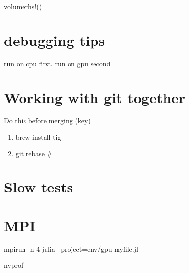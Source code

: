 \documentclass{article}
\begin{document}
volumerhs!()

\section{debugging tips}
run on cpu first. run on gpu second

\section{Working with git together}
Do this before merging (key)
\begin{enumerate}
    \item brew install tig
    \item git rebase \#
\end{enumerate}



\section{Slow tests}

\section{MPI}

mpirun -n 4 julia --project=env/gpu myfile.jl

nvprof
\end{document}
